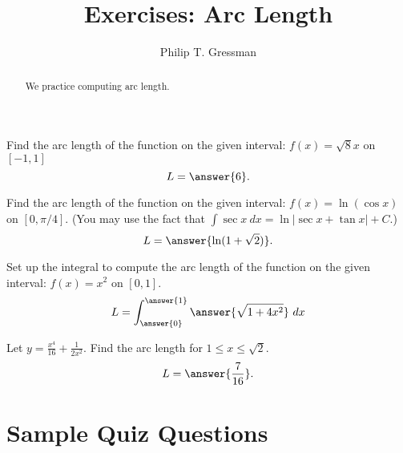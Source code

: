 \documentclass{ximera}
\title{Exercises: Arc Length}
\author{Philip T. Gressman}
\begin{document}
\begin{abstract}
We practice computing arc length.
\end{abstract}
\maketitle

\begin{exercise}%
Find the arc length of the function on the given interval: \(\displaystyle f(x) = \sqrt{8}x\) on \([-1, 1]\)
\[ L = \answer{6}. \]
\end{exercise}

\begin{exercise}
Find the arc length of the function on the given interval: \(\displaystyle f(x) = \ln \left(\cos x\right)\) on \([0, \pi/4]\).
(You may use the fact that $\int \sec x ~ dx = \ln |\sec x + \tan x| + C$.)
\[ L = \answer{\ln (1 + \sqrt{2})}. \]
\end{exercise}

\begin{exercise}%
Set up the integral to compute the arc length of the function on the given interval: \(\displaystyle f(x) = x^2\) on \([0, 1]\).
\[ L = \int_{\answer{0}}^{\answer{1}} \answer{\sqrt{1+4x^2}} \ dx\]
%
%
\end{exercise}

\begin{question}%
Let \(\displaystyle y = \frac{x^4}{16} + \frac{1}{2x^2}\). Find the arc length for \(1 \leq x \leq \sqrt{2}\).
\[ L = \answer{\frac{7}{16}}. \]
\end{question}

\section*{Sample Quiz Questions}
\end{document}
